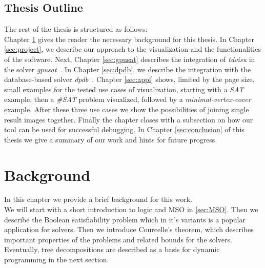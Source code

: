 \documentclass[a4paper, 12pt, bibliography=totoc]{scrartcl}
\begin{document}
\subsection{Thesis Outline}
The rest of the thesis is structured as follows: \\
Chapter \ref{sec:bg} gives the reader the necessary background for this thesis. In Chapter \ref{sec:project}, we describe our approach to the visualization and the functionalities of the software. Next, Chapter \ref{sec:gpusat} describes the integration of \textit{tdvisu} in the solver \textit{gpusat}~\cite{DiplomarbeitZisser}. In Chapter \ref{sec:dpdb}, we describe the integration with the database-based solver \textit{dpdb}~\cite{dpdbpadl2020}.
Chapter \ref{sec:appl} shows, limited by the page size, small examples for the tested use cases of visualization, starting with a \textit{SAT} example, then a \textit{\#SAT} problem visualized, followed by a \textit{minimal-vertex-cover} example. After these three use cases we show the possibilities of joining single result images together. Finally the chapter closes with a subsection on how our tool can be used for successful debugging. In Chapter \ref{sec:conclusion} of this thesis we give a summary of our work and hints for future progress.

\newpage
\section{Background}\label{sec:bg}
In this chapter we provide a brief background for this work.\\
We will start with a short introduction to logic and MSO in \ref{sec:MSO}. Then we describe the Boolean satisfiability problem which in it's variants is a popular application for solvers.
Then we introduce Courcelle's theorem, which describes important properties of the problems and related bounds for the solvers.
Eventually, tree decompositions are described as a basis for dynamic programming in the next section.
\end{document}
